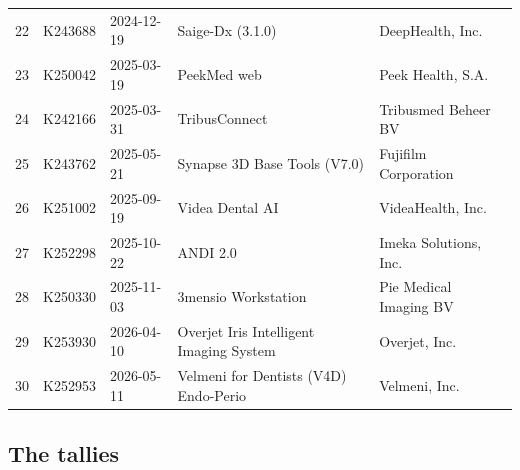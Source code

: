 \documentclass[11pt,a4paper]{article}
\begin{document}
{\begin{longtable}{@{}rllL{4.6cm}L{3.9cm}@{}}
22 & K243688 & 2024-12-19 & Saige-Dx (3.1.0) & DeepHealth, Inc. \\
23 & K250042 & 2025-03-19 & PeekMed web & Peek Health, S.A. \\
24 & K242166 & 2025-03-31 & TribusConnect & Tribusmed Beheer BV \\
25 & K243762 & 2025-05-21 & Synapse 3D Base Tools (V7.0) & Fujifilm Corporation \\
26 & K251002 & 2025-09-19 & Videa Dental AI & VideaHealth, Inc. \\
27 & K252298 & 2025-10-22 & ANDI 2.0 & Imeka Solutions, Inc. \\
28 & K250330 & 2025-11-03 & 3mensio Workstation & Pie Medical Imaging BV \\
29 & K253930 & 2026-04-10 & Overjet Iris Intelligent Imaging System & Overjet, Inc. \\
30 & K252953 & 2026-05-11 & Velmeni for Dentists (V4D) Endo-Perio & Velmeni, Inc. \\
\end{longtable}}

\subsection{The tallies}
\end{document}
